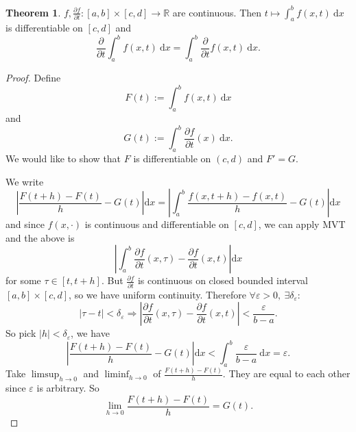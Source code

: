 \documentclass[a4paper]{article}
\theoremstyle{definition}
\newtheorem{thm}[defn]{Theorem}
\begin{document}
\begin{thm}
\label{thm:partderivcontimppartintcont}
$f,\frac{\partial f}{\partial t}:[a,b]\times [c,d]\rightarrow \mathbb R$ are continuous. Then $t\mapsto \int_a^b f(x,t) \ \mathrm d x$ is differentiable on $[c,d]$ and
\[
\frac{\partial}{\partial t} \int_a^b f(x,t) \ \mathrm d x = \int_a^b \frac{\partial }{\partial t} f(x,t) \ \mathrm d x .
\]
\end{thm}
\begin{proof}
Define
\[
F(t):=\int_a^b f(x,t) \ \mathrm d x
\]
and
\[
G(t) := \int_a^b \frac{\partial f}{\partial t} (x) \ \mathrm d x.
\]
We would like to show that $F$ is differentiable on $(c,d)$ and $F'=G$.

We write
\[
\left| \frac{F(t+h)-F(t)}{h}-G(t) \right|\mathrm dx = \left| \int_a^b \frac{f(x,t+h)-f(x,t)}{h}-G(t) \right|\mathrm  dx
\]
and since $f(x,\cdot)$ is continuous and differentiable on $[c,d]$, we can apply MVT and the above is
\[
\left| \int_a^b \frac{\partial f}{\partial t} (x,\tau) - \frac{\partial f}{\partial t} (x,t) \right|\mathrm d x
\]
for some $\tau \in [t,t+h]$. But $\frac{\partial f}{\partial t}$ is continuous on closed bounded interval $[a,b]\times [c,d]$, so we have uniform continuity. Therefore $\forall \varepsilon >0,\ \exists \delta_\varepsilon :$
\[
|\tau -t|<\delta_\varepsilon \Rightarrow \left| \frac{\partial f}{\partial t} (x,\tau) - \frac{\partial f}{\partial t} (x,t) \right| < \frac{\varepsilon}{b-a} .
\]
So pick $|h|<\delta_\varepsilon$, we have
\[
\left| \frac{F(t+h)-F(t)}{h}-G(t) \right|\mathrm dx<\int_a^b \frac{\varepsilon}{b-a} \ \mathrm d x=\varepsilon .
\]
Take $\limsup_{h\rightarrow 0}$ and $\liminf_{h\rightarrow 0}$ of $\frac{F(t+h)-F(t)}{h}$. They are equal to each other since $\varepsilon$ is arbitrary. So
\[
\lim_{h\rightarrow 0} \frac{F(t+h)-F(t)}{h}=G(t).
\]
\end{proof}
\end{document}
